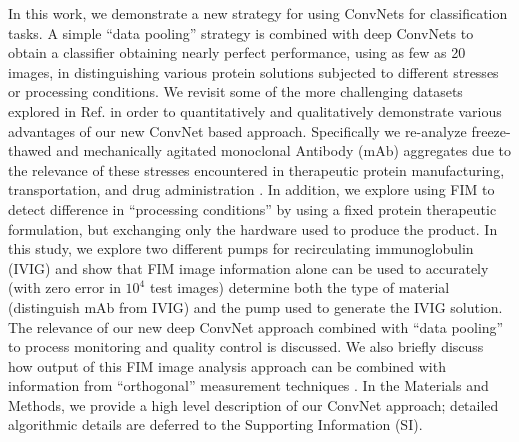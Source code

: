 \documentclass[%
reprint,
superscriptaddress,
 aps,
 pre,
]{revtex4-1}
\begin{document}
In this work, we demonstrate a new strategy for using  
ConvNets for classification tasks.  A simple ``data pooling''  strategy is combined with deep ConvNets to obtain a classifier obtaining nearly perfect performance, using as few as 20 images, in distinguishing various protein solutions subjected to different stresses or processing conditions.  We revisit some of the more challenging datasets explored in Ref. \cite{Maddux2017} in order to  quantitatively and qualitatively demonstrate various advantages of our new ConvNet based approach. Specifically we re-analyze freeze-thawed and mechanically agitated monoclonal Antibody (mAb) aggregates due to the relevance of these stresses
encountered in  therapeutic protein manufacturing, transportation, and drug administration  \cite{Maddux2017}.  In addition, we explore using FIM to detect difference in ``processing conditions'' by using a fixed protein therapeutic formulation, but exchanging only the hardware used to produce the product. In this study, we explore two different pumps for recirculating immunoglobulin (IVIG)  and show that FIM image information alone can be used to accurately (with zero error in $10^4$ test images) determine both the type of material (distinguish mAb from IVIG) and the pump used to generate the IVIG solution.  The relevance of our new deep ConvNet approach combined with ``data pooling'' to process monitoring and quality control is discussed.  
We also briefly discuss how output of this FIM image analysis approach can be combined with information from ``orthogonal'' measurement techniques
\cite{RiosQuiroz2016,Saggu2017}.  In the Materials and Methods, we provide a high level description of our ConvNet approach;  detailed algorithmic details are deferred to the Supporting Information (SI).  \\ 

\end{document}
